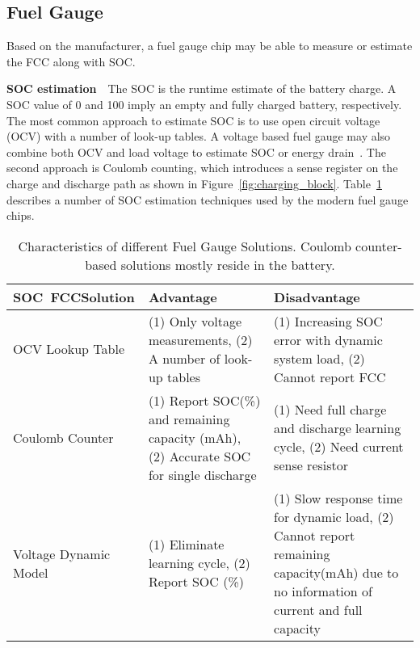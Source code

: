 \documentclass[journal]{IEEEtran}
\begin{document}
\subsection{Fuel Gauge}
Based on the manufacturer, a fuel gauge chip may be able to measure or estimate the FCC along with SOC. 

\noindent\textbf{SOC estimation}~~The SOC is the runtime estimate of the battery charge. A SOC value of 0 and 100 imply an empty and fully charged battery, respectively.  The most common approach to estimate SOC is to use open circuit voltage (OCV) with a number of look-up tables. A voltage based fuel gauge may also combine both OCV and load voltage to estimate SOC or energy drain~\cite{Koo:2016, maxim17048}. The second approach is Coulomb counting, which introduces a sense register on the charge and discharge path as shown in Figure~\ref{fig:charging_block}. Table~\ref{tab:fuelgauge_info} describes a number of SOC estimation techniques used by the modern fuel gauge chips. 









\begin{table}[t]
\begin{center}
  \caption{Characteristics of different Fuel Gauge Solutions. Coulomb counter-based solutions mostly reside in the battery.}

  {\footnotesize
    \begin{tabular}{|p{12mm}|p{28mm}|p{35mm}|}
      \hline      
       SOC~FCC\break Solution&Advantage&Disadvantage\\\hline
OCV Lookup Table & 
(1) Only voltage measurements,
(2) A number of look-up tables& 
(1) Increasing SOC error with dynamic system load,
(2) Cannot report FCC\\\hline
Coulomb Counter & 

(1) Report SOC(\%) and remaining capacity (mAh),
(2) Accurate SOC for single discharge&
(1) Need full charge and discharge learning cycle,
(2) Need current sense resistor\\\hline

Voltage Dynamic Model&
(1) Eliminate learning cycle,
(2) Report SOC (\%)
 &
(1) Slow response time for dynamic load,
(2) Cannot report remaining capacity(mAh) due to no information of current and full capacity\\\hline
  \end{tabular}}
\label{tab:fuelgauge_info}
    \end{center}
 
\end{table}
\end{document}
